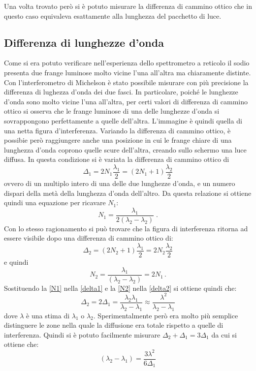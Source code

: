 \documentclass[a4paper,11pt]{article}
\begin{document}
Una volta trovato però si è potuto misurare la differenza di cammino ottico che in questo caso equivaleva esattamente alla lunghezza del pacchetto di luce. 

\subsection{Differenza di lunghezze d'onda}
Come si era potuto verificare nell'esperienza dello spettrometro a reticolo il sodio presenta due frange luminose molto vicine l'una all'altra ma chiaramente distinte. Con l'interferometro di Michelson è stato possibile misurare con più precisione la differenza di lughezza d'onda dei due fasci. In particolare, poiché le lunghezze d'onda sono molto vicine l'una all'altra, per certi valori di differenza di cammino ottico si osserva che le frange luminose di una delle lunghezze d'onda si sovrappongono perfettamente a quelle dell'altra. L'immagine è quindi quella di una netta figura d'interferenza. Variando la differenza di cammino ottico, è possibie però raggiungere anche una posizione in cui le frange chiare di una lunghezza d'onda coprono quelle scure dell'altra, creando sullo schermo una luce diffusa. In questa condizione si è variata la differenza di cammino ottico di
\begin{equation}\label{delta1}
	\Delta_1=2N_1\frac{\lambda_1}{2}=(2N_1+1)\frac{\lambda_2}{2}
\end{equation}
ovvero di un multiplo intero di una delle due lunghezze d'onda, e un numero dispari della metà della lunghezza d'onda dell'altro. Da questa relazione si ottiene quindi una equazione per ricavare $ N_1 $:
\begin{equation}\label{N1}
	N_1=\dfrac{\lambda_1}{2\left(\lambda_2-\lambda_2\right)}\;.
\end{equation}
Con lo stesso ragionamento si può trovare che la figura di interferenza ritorna ad essere visibile dopo una differenza di cammino ottico di:
\begin{equation}\label{delta2}
	\Delta_2=(2N_2+1)\frac{\lambda_1}{2}=2N_2\frac{\lambda_2}{2}
\end{equation}
e quindi 
\begin{equation}\label{N2}
	N_2=\dfrac{\lambda_1}{\left(\lambda_2-\lambda_2\right)}=2N_1 \, .
\end{equation}
Sostituendo la \ref{N1} nella \ref{delta1} e la \ref{N2} nella \ref{delta2} si ottiene quindi che:
\begin{equation}\label{deltas}
	\Delta_2=2\Delta_1=\dfrac{\lambda_2\lambda_1}{\lambda_2-\lambda_1}\approx\dfrac{\lambda^2}{\lambda_2-\lambda_1}
\end{equation}
dove $ \lambda $ è una stima di $ \lambda_1 $ o $ \lambda_2 $. Sperimentalmente però era molto più semplice distinguere le zone nella quale la diffusione era totale rispetto a quelle di interferenza. Quindi si è potuto facilmente misurare $ \Delta_2+\Delta_1=3\Delta_1 $ da cui si ottiene che:
\begin{equation}\label{delta-lambda}
	\left(\lambda_2-\lambda_1\right)=\dfrac{3\lambda^2}{6\Delta_1}
\end{equation}
\end{document}
